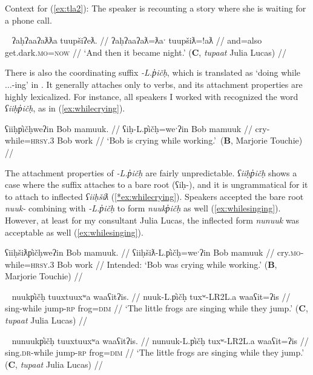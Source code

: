 \noindent Context for (\ref{ex:tla2}): The speaker is recounting a story where she is waiting for a phone call.

\ex~ \label{ex:tla2}
\begingl
\glpreamble ʔaḥʔaaʔaƛƛa tuupšiʔeƛ. //
\gla ʔaḥʔaaʔaƛ=ƛaˑ tuupšiƛ=!aƛ //
\glb and=also get.dark.\textsc{mo}=\textsc{now}  //
\glft `And then it became night.' (\textbf{C}, \textit{tupaat} Julia Lucas) //
\endgl
\xe

There is also the coordinating suffix \textit{-L.p̓ičḥ}, which is translated as `doing while $\ldots$-ing' in \citet{sapir1939}. It generally attaches only to verbs, and its attachment properties are highly lexicalized. For instance, all speakers I worked with recognized the word \textit{ʕiiḥp̓ičḥ}, as in (\ref{ex:whilecrying}).

\ex \label{ex:whilecrying}
\begingl
\glpreamble ʕiiḥp̓ičḥweʔin Bob mamuuk. //
\gla ʕiḥ-L.p̓ičḥ=weˑʔin Bob mamuuk //
\glb cry-while=\textsc{hrsy.3} Bob work //
\glft `Bob is crying while working.'\footnotemark{}\ (\textbf{B}, Marjorie Touchie) //
\endgl
\xe


The attachment properties of \textit{-L.p̓ičḥ} are fairly unpredictable. \textit{ʕiiḥp̓ičḥ} shows a case where the suffix attaches to a bare root (ʕiḥ-), and it is ungrammatical for it to attach to inflected \textit{ʕiiḥšiƛ} (\ref{*ex:whilecrying}). Speakers accepted the bare root \textit{nuuk-} combining with \textit{-L.p̓ičḥ} to form \textit{nuukp̓ičḥ} as well (\ref{ex:whilesinging}). However, at least for my consultant Julia Lucas, the inflected form \textit{nunuuk} was acceptable as well (\ref{ex:whilesinging}).

\ex \label{*ex:whilecrying}
\begingl
\glpreamble *ʕiiḥšiƛp̓ičḥweʔin Bob mamuuk. //
\gla ʕiiḥšiƛ-L.p̓ičḥ=weˑʔin Bob mamuuk //
\glb cry.\textsc{mo}-while=\textsc{hrsy.3} Bob work //
\glft Intended: `Bob was crying while working.' (\textbf{B}, Marjorie Touchie) //
\endgl
\xe

\ex~ \label{ex:whilesinging}
\begingl
\glpreamble nuukp̓ičḥ tuuxtuuxʷa waaʕitʔis. //
\gla nuuk-L.p̓ičḥ tuxʷ-LR2L.a waaʕit=ʔis //
\glb sing-while jump-\textsc{rp} frog=\textsc{dim} //
\glft `The little frogs are singing while they jump.' (\textbf{C}, \textit{tupaat} Julia Lucas) //
\endgl
\xe

\ex~ \label{ex:whilesinging2}
\begingl
\glpreamble nunuukp̓ičḥ tuuxtuuxʷa waaʕitʔis. //
\gla nunuuk-L.p̓ičḥ tuxʷ-LR2L.a waaʕit=ʔis //
\glb sing.\textsc{dr}-while jump-\textsc{rp} frog=\textsc{dim} //
\glft `The little frogs are singing while they jump.' (\textbf{C}, \textit{tupaat} Julia Lucas) //
\endgl
\xe

